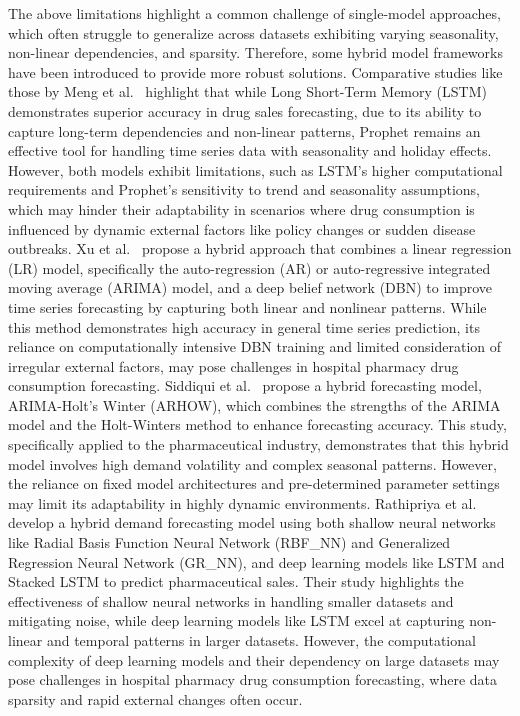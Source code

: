 \documentclass[journal]{IEEEtran}
\begin{document}
The above limitations highlight a common challenge of single-model approaches, which often struggle to generalize across datasets exhibiting varying seasonality, non-linear dependencies, and sparsity. Therefore, some hybrid model frameworks have been introduced to provide more robust solutions. Comparative studies like those by Meng et al.~\cite{meng2021comparative} highlight that while Long Short-Term Memory (LSTM) demonstrates superior accuracy in drug sales forecasting, due to its ability to capture long-term dependencies and non-linear patterns, Prophet remains an effective tool for handling time series data with seasonality and holiday effects. However, both models exhibit limitations, such as LSTM's higher computational requirements and Prophet's sensitivity to trend and seasonality assumptions, which may hinder their adaptability in scenarios where drug consumption is influenced by dynamic external factors like policy changes or sudden disease outbreaks. Xu et al.~\cite{xu2019hybrid} propose a hybrid approach that combines a linear regression (LR) model, specifically the auto-regression (AR) or auto-regressive integrated moving average (ARIMA) model, and a deep belief network (DBN) to improve time series forecasting by capturing both linear and nonlinear patterns. While this method demonstrates high accuracy in general time series prediction, its reliance on computationally intensive DBN training and limited consideration of irregular external factors, may pose challenges in hospital pharmacy drug consumption forecasting. Siddiqui et al.~\cite{siddiqui2021hybrid} propose a hybrid forecasting model, ARIMA-Holt’s Winter (ARHOW), which combines the strengths of the ARIMA model and the Holt-Winters method to enhance forecasting accuracy. This study, specifically applied to the pharmaceutical industry, demonstrates that this hybrid model involves high demand volatility and complex seasonal patterns. However, the reliance on fixed model architectures and pre-determined parameter settings may limit its adaptability in highly dynamic environments. Rathipriya et al.~\cite{rathipriya2022pharma} develop a hybrid demand forecasting model using both shallow neural networks like Radial Basis Function Neural Network (RBF\_NN) and Generalized Regression Neural Network (GR\_NN), and deep learning models like LSTM and Stacked LSTM to predict pharmaceutical sales. Their study highlights the effectiveness of shallow neural networks in handling smaller datasets and mitigating noise, while deep learning models like LSTM excel at capturing non-linear and temporal patterns in larger datasets. However, the computational complexity of deep learning models and their dependency on large datasets may pose challenges in hospital pharmacy drug consumption forecasting, where data sparsity and rapid external changes often occur.
\end{document}
